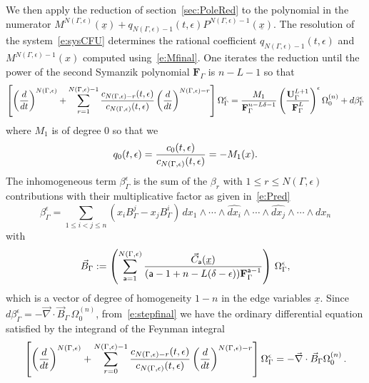 \documentclass[a4paper,12pt]{article}
\numberwithin{equation}{section}
\numberwithin{figure}{section}
\begin{document}
We then apply the reduction of section~\ref{sec:PoleRed} to
the polynomial in the numerator
$M^{
      N(\Gamma,\epsilon)}(\underline x)+q_{N(\Gamma,\epsilon)-1}(t,\epsilon)
    P^{N(\Gamma,\epsilon)-1}(\underline x)$.
The resolution of the
system~\eqref{e:sysCFU} determines the  rational coefficient
$q_{N(\Gamma,\epsilon)-1}(t,\epsilon)$ and
$M^{N(\Gamma,\epsilon)-1}(x)$ computed using~\eqref{e:Mfinal}. One
iterates the reduction until the power of  the second Symanzik
polynomial $\textbf{F}_\Gamma$ is $n-L-1$ so
that
\begin{equation}\label{e:stepfinal}
\left[\left(d\over dt\right)^{N(\Gamma,\epsilon)}
  +\sum_{r=1}^{N(\Gamma,\epsilon)-1}
  {c_{N(\Gamma,\epsilon)-r}(t,\epsilon)\over c_{N(\Gamma,\epsilon)}(t,\epsilon)} \left(d\over dt\right)^{N(\Gamma,\epsilon)-r}\right] \Omega_\Gamma^\epsilon= {M_{1}\over
    \textbf{F}_\Gamma^{n-L\delta-1}
  }\left(\textbf{U}_\Gamma^{L+1}\over \textbf{F}_\Gamma^L
  \right)^\epsilon \Omega_0^{(n)}+ d\beta_\Gamma^\epsilon 
\end{equation}
where $M_1$ is of degree 0 so that we
\begin{equation}
  q_0(t,\epsilon)=  {c_{0}(t,\epsilon)\over c_{N(\Gamma,\epsilon)}(t,\epsilon)}= -M_1(x)  .
\end{equation}
The inhomogeneous term  $\beta_\Gamma^\epsilon $ is the sum of the
$\beta_r$ with $1\leq
r\leq N(\Gamma,\epsilon)$
contributions with their multiplicative factor as given
in~\eqref{e:Pred}
\begin{equation}
  \label{e:betaGamma}
  \beta_\Gamma^\epsilon= \sum_{1\leq i<j\leq n} (x_i B^j_\Gamma- x_j B^i_\Gamma) \,
  dx_1\wedge \cdots \wedge \widehat{dx_i}\wedge \cdots \wedge\widehat{dx_j}\wedge
  \cdots \wedge dx_n 
\end{equation}
with
\begin{equation}
  \label{e:BetaGamma}
  \vec B_\Gamma:=\left(\sum_{\mathsf{a}=1}^{N(\Gamma,\epsilon)} {
      \vec C_{\mathsf{a}} (\underline x) \over
   ( \mathsf{a}-1+n-L(\delta-\epsilon))\mathbf{F}_\Gamma^{\mathsf{a}-1}}\right) \,\Omega_\Gamma^\epsilon ,
\end{equation}
which is a vector of degree of homogeneity $1-n$ in the edge variables
$\underline x$.
Since $d\beta_\Gamma^\epsilon= -\vec\nabla\cdot \vec B_\Gamma\,
\Omega_0^{(n)}$, from~\eqref{e:stepfinal} we have the ordinary
differential equation satisfied by the integrand of the Feynman
integral
\begin{equation}\label{e:stepfinalode}
\left[\left(d\over dt\right)^{N(\Gamma,\epsilon)}
  +\sum_{r=0}^{N(\Gamma,\epsilon)-1}
  {c_{N(\Gamma,\epsilon)-r}(t,\epsilon)\over c_{N(\Gamma,\epsilon)}(t,\epsilon)} \left(d\over dt\right)^{N(\Gamma,\epsilon)-r}\right] \Omega_\Gamma^\epsilon =-\vec\nabla\cdot \vec B_\Gamma\Omega_0^{(n)}\,.
\end{equation}
\end{document}
